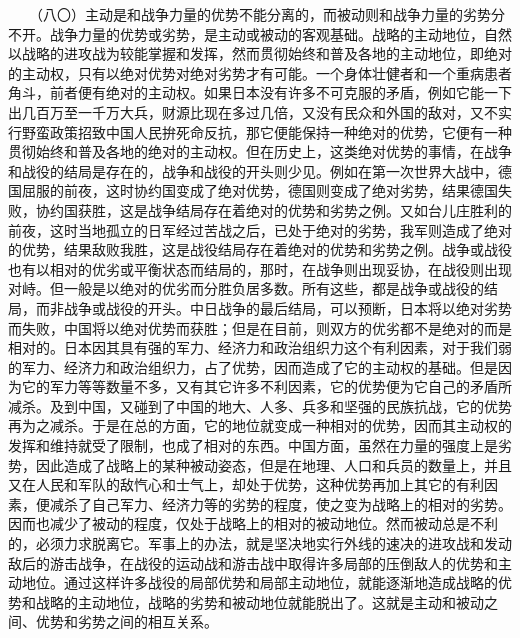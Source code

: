 \documentclass[cn,11pt,chinese]{elegantbook}
\begin{document}
　　（八〇）主动是和战争力量的优势不能分离的，而被动则和战争力量的劣势分不开。战争力量的优势或劣势，是主动或被动的客观基础。战略的主动地位，自然以战略的进攻战为较能掌握和发挥，然而贯彻始终和普及各地的主动地位，即绝对的主动权，只有以绝对优势对绝对劣势才有可能。一个身体壮健者和一个重病患者角斗，前者便有绝对的主动权。如果日本没有许多不可克服的矛盾，例如它能一下出几百万至一千万大兵，财源比现在多过几倍，又没有民众和外国的敌对，又不实行野蛮政策招致中国人民拚死命反抗，那它便能保持一种绝对的优势，它便有一种贯彻始终和普及各地的绝对的主动权。但在历史上，这类绝对优势的事情，在战争和战役的结局是存在的，战争和战役的开头则少见。例如在第一次世界大战中，德国屈服的前夜，这时协约国变成了绝对优势，德国则变成了绝对劣势，结果德国失败，协约国获胜，这是战争结局存在着绝对的优势和劣势之例。又如台儿庄胜利的前夜，这时当地孤立的日军经过苦战之后，已处于绝对的劣势，我军则造成了绝对的优势，结果敌败我胜，这是战役结局存在着绝对的优势和劣势之例。战争或战役也有以相对的优劣或平衡状态而结局的，那时，在战争则出现妥协，在战役则出现对峙。但一般是以绝对的优劣而分胜负居多数。所有这些，都是战争或战役的结局，而非战争或战役的开头。中日战争的最后结局，可以预断，日本将以绝对劣势而失败，中国将以绝对优势而获胜；但是在目前，则双方的优劣都不是绝对的而是相对的。日本因其具有强的军力、经济力和政治组织力这个有利因素，对于我们弱的军力、经济力和政治组织力，占了优势，因而造成了它的主动权的基础。但是因为它的军力等等数量不多，又有其它许多不利因素，它的优势便为它自己的矛盾所减杀。及到中国，又碰到了中国的地大、人多、兵多和坚强的民族抗战，它的优势再为之减杀。于是在总的方面，它的地位就变成一种相对的优势，因而其主动权的发挥和维持就受了限制，也成了相对的东西。中国方面，虽然在力量的强度上是劣势，因此造成了战略上的某种被动姿态，但是在地理、人口和兵员的数量上，并且又在人民和军队的敌忾心和士气上，却处于优势，这种优势再加上其它的有利因素，便减杀了自己军力、经济力等的劣势的程度，使之变为战略上的相对的劣势。因而也减少了被动的程度，仅处于战略上的相对的被动地位。然而被动总是不利的，必须力求脱离它。军事上的办法，就是坚决地实行外线的速决的进攻战和发动敌后的游击战争，在战役的运动战和游击战中取得许多局部的压倒敌人的优势和主动地位。通过这样许多战役的局部优势和局部主动地位，就能逐渐地造成战略的优势和战略的主动地位，战略的劣势和被动地位就能脱出了。这就是主动和被动之间、优势和劣势之间的相互关系。\\
\end{document}
